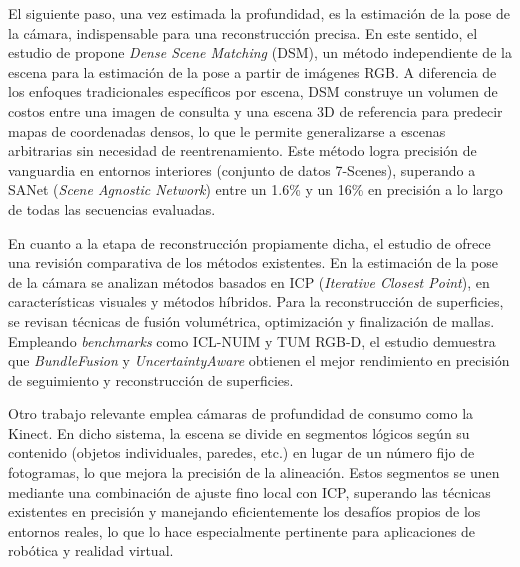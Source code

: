 \documentclass[12pt, a4, twoside, openany]{report}
\begin{document}
El siguiente paso, una vez estimada la profundidad, es la estimación de la pose de la cámara, indispensable para una reconstrucción precisa. En este sentido, el estudio de \cite{tang2021learning} propone \textit{Dense Scene Matching} (DSM), un método independiente de la escena para la estimación de la pose a partir de imágenes RGB. A diferencia de los enfoques tradicionales específicos por escena, DSM construye un volumen de costos entre una imagen de consulta y una escena 3D de referencia para predecir mapas de coordenadas densos, lo que le permite generalizarse a escenas arbitrarias sin necesidad de reentrenamiento. Este método logra precisión de vanguardia en entornos interiores (conjunto de datos 7-Scenes), superando a SANet (\textit{Scene Agnostic Network}) \cite{9009066} entre un 1.6\% y un 16\% en precisión a lo largo de todas las secuencias evaluadas.

En cuanto a la etapa de reconstrucción propiamente dicha, el estudio de \cite{li2022high} ofrece una revisión comparativa de los métodos existentes. En la estimación de la pose de la cámara se analizan métodos basados en ICP (\textit{Iterative Closest Point}), en características visuales y métodos híbridos. Para la reconstrucción de superficies, se revisan técnicas de fusión volumétrica, optimización y finalización de mallas. Empleando \textit{benchmarks} como ICL-NUIM y TUM RGB-D, el estudio demuestra que \textit{BundleFusion} \cite{10.1145/3072959.3054739} y \textit{UncertaintyAware} \cite{tan2025uncertaintyawarenormalguidedgaussiansplatting} obtienen el mejor rendimiento en precisión de seguimiento y reconstrucción de superficies.

Otro trabajo relevante \cite{li2018elaborate} emplea cámaras de profundidad de consumo como la Kinect. En dicho sistema, la escena se divide en segmentos lógicos según su contenido (objetos individuales, paredes, etc.) en lugar de un número fijo de fotogramas, lo que mejora la precisión de la alineación. Estos segmentos se unen mediante una combinación de ajuste fino local con ICP, superando las técnicas existentes en precisión y manejando eficientemente los desafíos propios de los entornos reales, lo que lo hace especialmente pertinente para aplicaciones de robótica y realidad virtual.

\newpage
\end{document}

